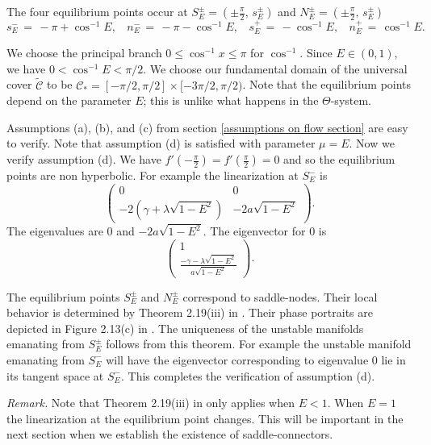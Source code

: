 \documentclass[11 pt]{article}
\renewcommand\l{\lambda}
\renewcommand\({\left(}
\renewcommand\){\right)}
\newcommand\wt{\widetilde}
\newcommand\<{\langle}
\renewcommand\>{\rangle}
\renewcommand\l{\lambda}
\newcommand\g{\gamma}
\newcommand\8{\infty}
\newcommand{\mc}{\mathcal}
\begin{document}
The four equilibrium points occur at $S^\pm_E = (\pm \frac{\pi}{2},\, s^\pm_E)$ and $N^\pm_E = (\pm \frac{\pi}{2}, \, s^\pm_E)$ 
\[
s_E^- \,=\, -\pi + \cos^{-1}E, \:\:\:\: n_E^- \,=\, -\pi - \cos^{-1}E, \:\:\:\: s_E^+ \,=\, -\cos^{-1}E,\:\:\:\: n_E^+ \,=\, \cos^{-1}E. 
\]

We choose the principal branch $0 \leq \cos^{-1}x \leq \pi$ for $\cos^{-1}$. Since $E \in (0,1)$, we have $0 < \cos^{-1} E < \pi/2$.  We choose our fundamental domain of the universal cover $\wt{\mc{C}}$ to be $\mc{C}_* = [-\pi/2, \pi/2] \times [-3\pi/2, \pi/2)$. Note that the equilibrium points depend on the parameter $E$; this is unlike what happens in the $\Theta$-system. 

Assumptions (a), (b), and (c) from section \ref{assumptions on flow section} are easy to verify. Note that assumption (d) is satisfied with parameter $\mu = E$. Now we verify assumption (d). We have $f'(-\frac{\pi}{2}) = f'(\frac{\pi}{2}) = 0$ and so the equilibrium points are non hyperbolic. For example the linearization at $S^-_E$ is 
\[
\begin{pmatrix}
0 & 0
\\
-2(\g + \l\sqrt{1 - E^2}) & -2a\sqrt{1 - E^2}
\end{pmatrix}.
\]
The eigenvalues are $0$ and $-2a\sqrt{1 - E^2}$.  The eigenvector for $0$ is 
\[
\begin{pmatrix}
1
\\
\frac{-\g - \l\sqrt{1 - E^2}}{a\sqrt{1 - E^2}}
\end{pmatrix}.
\]



The equilibrium points $S^\pm_E$ and $N^\pm_E$ correspond to saddle-nodes. Their local behavior is determined by Theorem 2.19(iii) in \cite{QTPDS}. Their phase portraits are depicted in Figure 2.13(c) in \cite{QTPDS}. The uniqueness of the unstable manifolds emanating from $S^\pm_E$ follows from this theorem. For example the unstable manifold emanating from $S^-_E$ will have the eigenvector corresponding to eigenvalue 0 lie in its tangent space at $S^-_E$. This completes the verification of assumption (d). 

\medskip
\medskip


\noindent\emph{Remark.} Note that Theorem 2.19(iii) in \cite{QTPDS} only applies when $E < 1$. When $E = 1$ the linearization at the equilibrium point changes. This will be important in the next section when we establish the existence of saddle-connectors. 

\medskip
\medskip
\end{document}

